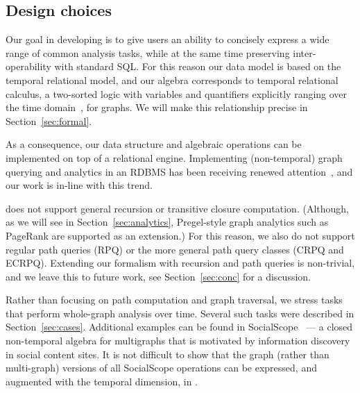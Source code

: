 \subsection{Design choices}
\label{sec:algebra:prelim}

Our goal in developing \tga is to give users an ability to concisely
express a wide range of common analysis tasks, while at the same time
preserving inter-operability with standard SQL.  For this reason our
data model is based on the temporal relational model, and our algebra
corresponds to temporal relational calculus, a two-sorted logic with
variables and quantifiers explicitly ranging over the time
domain~\cite{DBLP:reference/db/Toman09}, for graphs.  We will make
this relationship precise in Section~\ref{sec:formal}.

As a consequence, our data structure and algebraic operations can be
implemented on top of a relational engine.  Implementing
(non-temporal) graph querying and analytics in an RDBMS has been
receiving renewed
attention~\cite{DBLP:conf/sigmod/AbergerTOR16,DBLP:conf/sigmod/SunFSKHX15,DBLP:journals/pvldb/Xirogiannopoulos15},
and our work is in-line with this trend.

\tga does not support general recursion or transitive closure
computation. (Although, as we will see in Section~\ref{sec:analytics},
Pregel-style graph analytics such as PageRank are supported as an
extension.)  For this reason, we also do not support regular path
queries (RPQ) or the more general path query classes (CRPQ and ECRPQ).
Extending our formalism with recursion and path queries is
non-trivial, and we leave this to future work, see
Section~\ref{sec:conc} for a discussion.

Rather than focusing on path computation and graph traversal, we
stress tasks that perform whole-graph analysis over time.  Several
such tasks were described in Section~\ref{sec:cases}.  Additional
examples can be found in SocialScope~\cite{Amer-Yahia2009} --- a
closed non-temporal algebra for multigraphs that is motivated by
information discovery in social content sites.  It is not difficult to
show that the graph (rather than multi-graph) versions of all
SocialScope operations can be expressed, and augmented with the
temporal dimension, in \tga.

